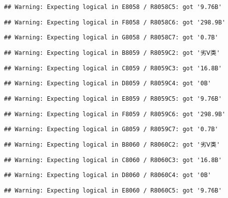 \documentclass[
]{article}
\begin{document}
\begin{verbatim}
## Warning: Expecting logical in E8058 / R8058C5: got '9.76B'
\end{verbatim}

\begin{verbatim}
## Warning: Expecting logical in F8058 / R8058C6: got '298.9B'
\end{verbatim}

\begin{verbatim}
## Warning: Expecting logical in G8058 / R8058C7: got '0.7B'
\end{verbatim}

\begin{verbatim}
## Warning: Expecting logical in B8059 / R8059C2: got '劣Ⅴ类'
\end{verbatim}

\begin{verbatim}
## Warning: Expecting logical in C8059 / R8059C3: got '16.8B'
\end{verbatim}

\begin{verbatim}
## Warning: Expecting logical in D8059 / R8059C4: got '0B'
\end{verbatim}

\begin{verbatim}
## Warning: Expecting logical in E8059 / R8059C5: got '9.76B'
\end{verbatim}

\begin{verbatim}
## Warning: Expecting logical in F8059 / R8059C6: got '298.9B'
\end{verbatim}

\begin{verbatim}
## Warning: Expecting logical in G8059 / R8059C7: got '0.7B'
\end{verbatim}

\begin{verbatim}
## Warning: Expecting logical in B8060 / R8060C2: got '劣Ⅴ类'
\end{verbatim}

\begin{verbatim}
## Warning: Expecting logical in C8060 / R8060C3: got '16.8B'
\end{verbatim}

\begin{verbatim}
## Warning: Expecting logical in D8060 / R8060C4: got '0B'
\end{verbatim}

\begin{verbatim}
## Warning: Expecting logical in E8060 / R8060C5: got '9.76B'
\end{verbatim}
\end{document}
